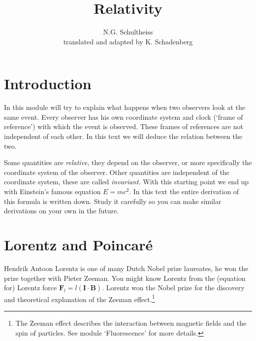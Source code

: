 


\author{N.G. Schultheiss \\ translated and adapted by K. Schadenberg}
\date{}
\title{Relativity}



\maketitle

\section{Introduction}
In this module will try to explain what happens when two observers look at the same event. Every observer has his own coordinate system and clock (`frame of reference') with which the event is observed. These frames of references are not independent of each other. In this text we will deduce the relation between the two.

Some quantities are \textit{relative}, they depend on the observer, or more specifically the coordinate system of the observer. Other quantities are independent of the coordinate system, these are called \textit{invariant}. With this starting point we end up with Einstein's famous equation $E=mc^2$. In this text the entire derivation of this formula is written down. Study it carefully so you can make similar derivations on your own in the future.

\section{Lorentz and Poincar\'e}
Hendrik Antoon Lorentz is one of many Dutch Nobel prize laureates, he won the prize together with Pieter Zeeman. You might know Lorentz from the (equation for) Lorentz force $\textbf{F}_l = l(\textbf{I} \cdot \textbf{B})$. Lorentz won the Nobel prize for the discovery and theoretical explanation of the Zeeman effect.\footnote{The Zeeman effect describes the interaction between magnetic fields and the spin of particles. See module `Fluorescence' for more details.}

